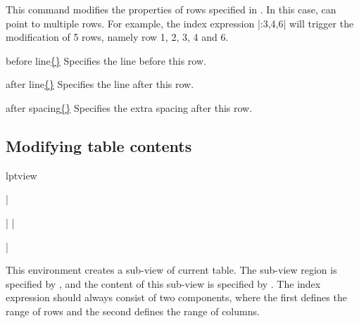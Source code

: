 \documentclass{l3doc}
\newcommand{\optiondf}[1]{\uline{#1}}
\begin{document}
\begin{documentation}
\begin{function}{\LPTAddRow}
\end{function}


\begin{function}{\LPTSetRowProp}

    \begin{syntax}
          
    \end{syntax}
    
    This command modifies the properties of rows specified in . In this case,  can point to multiple rows. For example, the index expression |:3,4,6| will trigger the modification of 5 rows, namely row 1, 2, 3, 4 and 6.
    
    \begin{optiondetail}{}
        \begin{optionitem}{before line}{\optiondf{\{\}}}
            Specifies the line before this row.
        \end{optionitem}
        \begin{optionitem}{after line}{\optiondf{\{\}}}
            Specifies the line after this row.
        \end{optionitem}
        \begin{optionitem}{after spacing}{\optiondf{\{\}}}
            Specifies the extra spacing after this row.
        \end{optionitem}
    \end{optiondetail}

\end{function}

\subsection{Modifying table contents}

\begin{environment}{lptview}

\begin{syntax}
|\begin{lptview}| 
|\end{lptview}|
\end{syntax}

This environment creates a sub-view of current table. The sub-view region is specified by , and the content of this sub-view is specified by . The index expression should always consist of two components, where the first defines the range of rows and the second defines the range of columns.
\end{environment}



\end{documentation}
\end{document}
